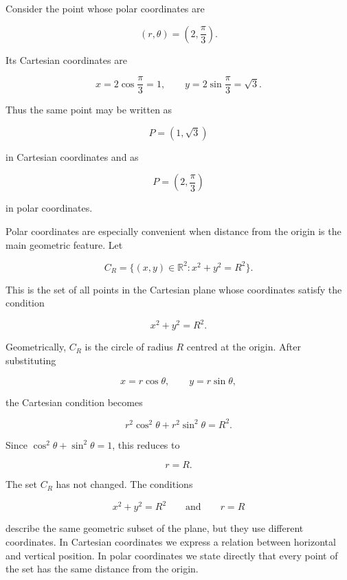 \begin{examplebox}
Consider the point whose polar coordinates are

\[
(r,\theta)=\left(2,\frac{\pi}{3}\right).
\]

Its Cartesian coordinates are

\[
x=2\cos\frac{\pi}{3}=1,
\qquad
y=2\sin\frac{\pi}{3}=\sqrt{3}.
\]

Thus the same point may be written as

\[
P=\left(1,\sqrt{3}\right)
\]

in Cartesian coordinates and as

\[
P=\left(2,\frac{\pi}{3}\right)
\]

in polar coordinates.
\end{examplebox}

Polar coordinates are especially convenient when distance from the origin is the
main geometric feature. Let

\[
C_R
=
\{(x,y)\in\mathbb{R}^2:x^2+y^2=R^2\}.
\]

This is the set of all points in the Cartesian plane whose coordinates satisfy
the condition

\[
x^2+y^2=R^2.
\]

Geometrically, $C_R$ is the circle of radius $R$ centred at the origin.
After substituting

\[
x=r\cos\theta,
\qquad
y=r\sin\theta,
\]

the Cartesian condition becomes

\[
r^2\cos^2\theta+r^2\sin^2\theta=R^2.
\]

Since $\cos^2\theta+\sin^2\theta=1$, this reduces to

\[
\boxed{r=R}.
\]

The set $C_R$ has not changed. The conditions

\[
x^2+y^2=R^2
\qquad\text{and}\qquad
r=R
\]

describe the same geometric subset of the plane, but they use different
coordinates. In Cartesian coordinates we express a relation between horizontal
and vertical position. In polar coordinates we state directly that every point
of the set has the same distance from the origin.

\begin{center}
\end{center}

